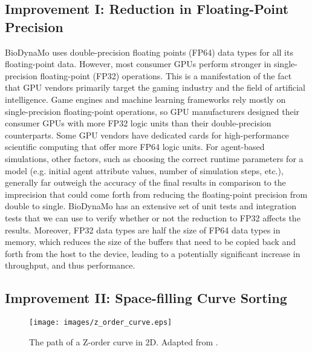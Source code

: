 \documentclass[conference]{IEEEtran}
\begin{document}
\subsection{Improvement I: Reduction in Floating-Point Precision}
\label{ssec:gpu_improvement-2}
\par BioDynaMo uses double-precision floating points (FP64) data types for all its floating-point data.
However, most consumer GPUs perform stronger in single-precision floating-point (FP32) operations.
This is a manifestation of the fact that GPU vendors primarily target the gaming industry and the field of artificial intelligence.
Game engines and machine learning frameworks rely mostly on single-precision floating-point operations, so GPU manufacturers designed their consumer GPUs with more FP32 logic units than their double-precision counterparts.
Some GPU vendors have dedicated cards for high-performance scientific computing that offer more FP64 logic units.
For agent-based simulations, other factors, such as choosing the correct runtime parameters for a model (e.g. initial agent attribute values, number of simulation steps, etc.), generally far outweigh the accuracy of the final results in comparison to the imprecision that could come forth from reducing the floating-point precision from double to single.
BioDynaMo has an extensive set of unit tests and integration tests that we can use to verify whether or not the reduction to FP32 affects the results.
Moreover, FP32 data types are half the size of FP64 data types in memory, which reduces the size of the buffers that need to be copied back and forth from the host to the device, leading to a potentially significant increase in throughput, and thus performance.

\subsection{Improvement II: Space-filling Curve Sorting}

\begin{figure}[!t]
    \centering
    \texttt{[image: images/z\_order\_curve.eps]}
    \caption{The path of a Z-order curve in 2D. Adapted from \cite{wikizorder}.}
    \label{fig:z_order_curve}
\end{figure}
\end{document}
